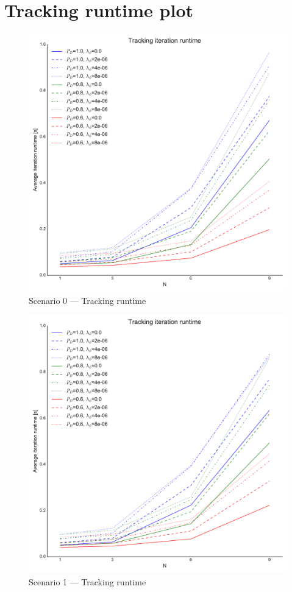
\chapter{Tracking runtime plot}
{
\setlength{\intextsep}{0mm}
\begin{figure}[H]
\centering
\includegraphics[height = .46\textheight]{Figures/plots/Scenario0_Tracking-Runtime.pdf}
\caption{Scenario 0 --- Tracking runtime}\label{fig:scenario0_tracking_runtime}
\end{figure}

\begin{figure}
\centering
\includegraphics[height = .46\textheight]{Figures/plots/Scenario1_Tracking-Runtime.pdf}
\caption{Scenario 1 --- Tracking runtime}\label{fig:scenario1_tracking_runtime}


\end{figure}}
